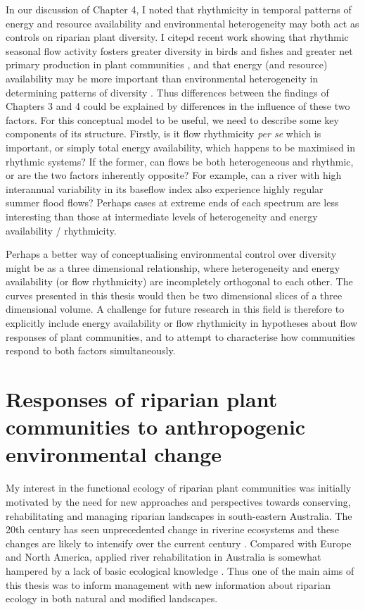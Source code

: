 {{In our discussion of Chapter 4, I noted that rhythmicity in temporal patterns of energy and resource availability and environmental heterogeneity may both act as controls on riparian plant diversity. I citepd recent work showing that rhythmic seasonal flow activity fosters greater diversity in birds and fishes and greater net primary production in plant communities \citep{Jardine2015}, and that energy (and resource) availability may be more important than environmental heterogeneity in determining patterns of diversity \citep{Lundholm2009}. Thus differences between the findings of Chapters 3 and 4 could be explained by differences in the influence of these two factors. For this conceptual model to be useful, we need to describe some key components of its structure. Firstly, is it flow rhythmicity \textit{per se} which is important, or simply total energy availability, which happens to be maximised in rhythmic systems? If the former, can flows be both heterogeneous and rhythmic, or are the two factors inherently opposite? For example, can a river with high interannual variability in its baseflow index also experience highly regular summer flood flows? Perhaps cases at extreme ends of each spectrum are less interesting than those at intermediate levels of heterogeneity and energy availability / rhythmicity.
 
Perhaps a better way of conceptualising environmental control over diversity might be as a three dimensional relationship, where heterogeneity and energy availability (or flow rhythmicity) are incompletely orthogonal to each other. The curves presented in this thesis would then be two dimensional slices of a three dimensional volume. A challenge for future research in this field is therefore to explicitly include energy availability or flow rhythmicity in hypotheses about flow responses of plant communities, and to attempt to characterise how communities respond to both factors simultaneously.

\section{Responses of riparian plant communities to anthropogenic environmental change}
My interest in the functional ecology of riparian plant communities was initially motivated by the need for new approaches and perspectives towards conserving, rehabilitating and managing riparian landscapes in south-eastern Australia. The 20th century has seen unprecedented change in riverine ecosystems and these changes are likely to intensify over the current century \citep{Nilsson2000, Hennessy2008}. Compared with Europe and North America, applied river rehabilitation in Australia is somewhat hampered by a lack of basic ecological knowledge \citep{Brooks2007}. Thus one of the main aims of this thesis was to inform management with new information about riparian ecology in both natural and modified landscapes.

}}
